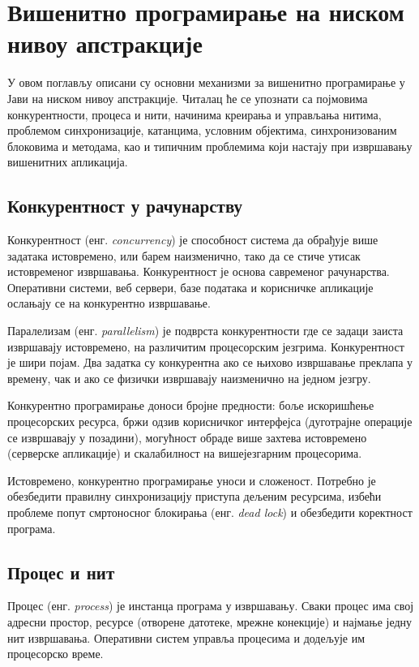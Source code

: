 \setlength{\parindent}{15pt}
\setlength{\parskip}{0pt}
\chapter{Вишенитно програмирање на ниском нивоу апстракције}

У овом поглављу описани су основни механизми за вишенитно програмирање у Јави на ниском нивоу апстракције. Читалац ће се упознати са појмовима конкурентности, процеса и нити, начинима креирања и управљања нитима, проблемом синхронизације, катанцима, условним објектима, синхронизованим блоковима и методама, као и типичним проблемима који настају при извршавању вишенитних апликација.


\section{Конкурентност у рачунарству}

Конкурентност (енг. \textit{concurrency}) је способност система да обрађује више задатака истовремено, или барем наизменично, тако да се стиче утисак истовременог извршавања. Конкурентност је основа савременог рачунарства. Оперативни системи, веб сервери, базе података и корисничке апликације ослањају се на конкурентно извршавање.

Паралелизам (енг. \textit{parallelism}) је подврста конкурентности где се задаци заиста извршавају истовремено, на различитим процесорским језгрима. Конкурентност је шири појам. Два задатка су конкурентна ако се њихово извршавање преклапа у времену, чак и ако се физички извршавају наизменично на једном језгру.

Конкурентно програмирање доноси бројне предности: боље искоришћење процесорских ресурса, бржи одзив корисничког интерфејса (дуготрајне операције се извршавају у позадини), могућност обраде више захтева истовремено (серверске апликације) и скалабилност на вишејезгарним процесорима.

Истовремено, конкурентно програмирање уноси и сложеност. Потребно је обезбедити правилну синхронизацију приступа дељеним ресурсима, избећи проблеме попут смртоносног блокирања (енг. \textit{dead lock})  и обезбедити коректност програма.


\section{Процес и нит}

Процес (енг. \textit{process}) је инстанца програма у извршавању. Сваки процес има свој адресни простор, ресурсе (отворене датотеке, мрежне конекције) и најмање једну нит извршавања. Оперативни систем управља процесима и додељује им процесорско време.

